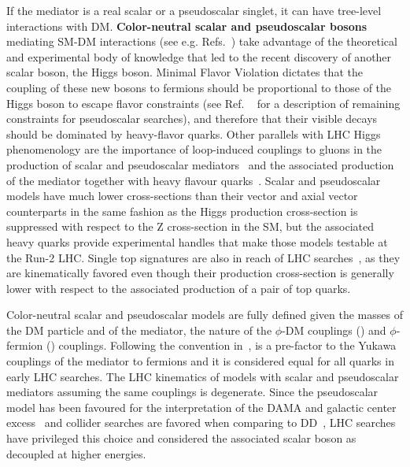 If the mediator is a real scalar or a pseudoscalar singlet, it can have tree-level interactions with DM.
\textbf{Color-neutral scalar and pseudoscalar bosons} mediating SM-DM interactions (see e.g. Refs.~\cite{Buckley:2014fba}) take advantage of the theoretical and experimental body of knowledge that led to the recent discovery of another scalar boson, the Higgs boson. Minimal Flavor Violation dictates that the coupling of these new bosons to fermions should be proportional to those of the Higgs boson to escape flavor constraints (see Ref. ~\cite{Dolan:2014ska} for a description of remaining constraints for pseudoscalar searches), and therefore that their visible decays should be dominated by heavy-flavor quarks. Other parallels with LHC Higgs phenomenology are the importance of loop-induced couplings to gluons in the production of scalar and pseudoscalar mediators~\cite{Haisch:2015ioa,Mattelaer:2015haa} and the associated production of the mediator together with heavy flavour quarks~\cite{Buckley:2014fba}. Scalar and pseudoscalar models have much lower cross-sections than their vector and axial vector counterparts in the same fashion as the Higgs production cross-section is suppressed with respect to the Z cross-section in the SM, but the associated heavy quarks provide experimental handles that make those models testable at the Run-2 LHC. Single top signatures are also in reach of LHC searches~\cite{Pinna:2017tay}, as they are kinematically favored even though their production cross-section is generally lower with respect to the associated production of a pair of top quarks. %

Color-neutral scalar and pseudoscalar models are fully defined given the masses of the DM particle and of the mediator, the nature of the $\phi$-DM couplings (\gdm) and $\phi$-fermion (\gq) couplings. Following the convention in~\cite{Abercrombie:2015wmb}, \gq is a pre-factor to the Yukawa couplings of the mediator to fermions and it is considered equal for all quarks in early LHC searches. 
The LHC kinematics of models with scalar and pseudoscalar mediators assuming the same couplings is degenerate. Since the pseudoscalar model has been favoured for the interpretation of the DAMA and galactic center excess~\cite{Arina:2014yna,Agrawal:2014una} and collider searches are favored when comparing to DD~\cite{Banerjee:2017wxi}, LHC searches have privileged this choice and considered the associated scalar boson as decoupled at higher energies. 

